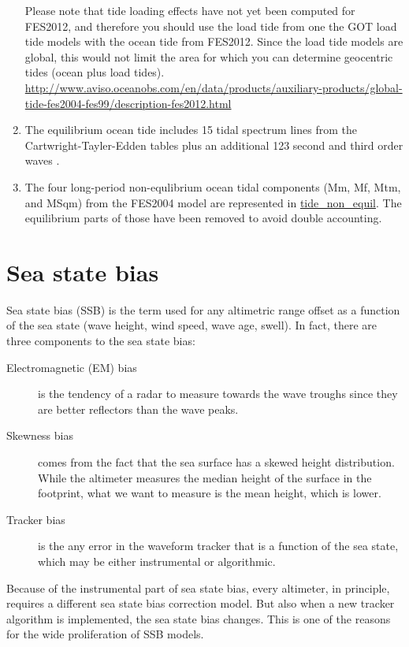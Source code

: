 \documentclass[a4paper,11pt,openany,natbib]{thesis}
\makeatletter
\newcommand\var[1]{\url{#1}\index{variables!#1@\protect\url{#1}}}
\makeatother
\begin{document}
\begin{enumerate}
Please note that tide loading effects have not yet been computed for FES2012, and therefore you should use the load tide from one the GOT load tide models with the ocean tide from FES2012. Since the load tide models are global, this would not limit the area for which you can determine geocentric tides (ocean plus load tides). \url{http://www.aviso.oceanobs.com/en/data/products/auxiliary-products/global-tide-fes2004-fes99/description-fes2012.html}\label{item:tide_ocean_fes12}
\item The equilibrium ocean tide includes 15 tidal spectrum lines from the Cartwright-Tayler-Edden tables \citep{cartwright1971,cartwright1973} plus an additional 123 second and third order waves \citep{tamura1987}.\label{item:tide_equil}
\item The four long-period non-equlibrium ocean tidal components (Mm, Mf, Mtm, and MSqm) from the FES2004 model are represented in \var{tide_non_equil}. The equilibrium parts of those have been removed to avoid double accounting.\label{item:tide_non_equil}
\end{enumerate}

\section{Sea state bias}
\label{var:ssb}
Sea state bias (SSB) is the term used for any altimetric range offset as a function of the sea state (wave height, wind speed, wave age, swell). In fact, there are three components to the sea state bias:
\begin{description}
\item[Electromagnetic (EM) bias] is the tendency of a radar to measure towards the wave troughs since they are better reflectors than the wave peaks.
\item[Skewness bias] comes from the fact that the sea surface has a skewed height distribution. While the altimeter measures the median height of the surface in the footprint, what we want to measure is the mean height, which is lower.
\item[Tracker bias] is the any error in the waveform tracker that is a function of the sea state, which may be either instrumental or algorithmic.
\end{description}

Because of the instrumental part of sea state bias, every altimeter, in principle, requires a different sea state bias correction model. But also when a new tracker algorithm is implemented, the sea state bias changes. This is one of the reasons for the wide proliferation of SSB models. 
\end{document}
